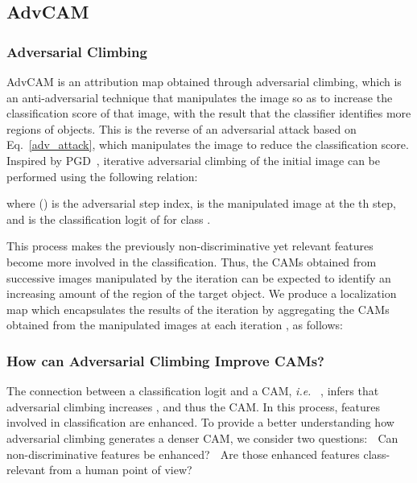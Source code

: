 \documentclass[final]{cvpr}
\begin{document}
\subsection{AdvCAM}\label{Advcam_method}
\subsubsection{Adversarial Climbing}
AdvCAM is an attribution map obtained through adversarial climbing, which is an anti-adversarial technique that manipulates the image so as to increase the classification score of that image, with the result that the classifier identifies more regions of objects.
This is the reverse of an adversarial attack based on Eq.~\ref{adv_attack}, which manipulates the image to reduce the classification score. 
Inspired by PGD~\cite{kurakin2016adversarial}, iterative adversarial climbing of the initial image  can be performed using the following relation:
\vspace{-0.1em}

where  () is the adversarial step index,  is the manipulated image at the th step, and  is the classification logit of  for class . 

This process makes the previously non-discriminative yet relevant features become more involved in the classification.
Thus, the CAMs obtained from successive images manipulated by the iteration can be expected to identify an increasing amount of the region of the target object.
We produce a localization map  which encapsulates the results of the iteration by aggregating the CAMs obtained from the manipulated images at each iteration , as follows: 
\vspace{-0.3em}



\subsubsection{How can Adversarial Climbing Improve CAMs?}\label{how_advcam}

The connection between a classification logit  and a CAM, \textit{i.e.} ~\cite{zhang2018adversarial}, infers that adversarial climbing increases , and thus the CAM. 
In this process, features involved in classification are enhanced.
To provide a better understanding how adversarial climbing generates a denser CAM, we consider two questions: \textcircled{\raisebox{-0.9pt}{1}} Can non-discriminative features be enhanced? \textcircled{\raisebox{-0.9pt}{2}} Are those enhanced features class-relevant from a human point of view?
\end{document}
